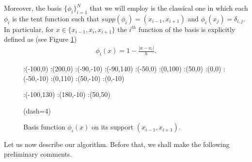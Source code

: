 Moreover, the basis $\big\{\phi_i\big\}_{i=1}^N$ that we will employ is the classical one in which each $\phi_i$ is the tent function such that $supp(\phi_i)=(x_{i-1},x_{i+1})$ and $\phi_i(x_j)=\delta_{i,j}$. In particular, for $x\in\{x_{i-1},x_i,x_{i+1}\}$ the $i^{th}$ function of the basis is explicitly defined as (see Figure \ref{basis}) 
\begin{align}\label{basis_fun}
	\phi_i(x)= 1-\frac{|x-x_i|}{h}.
\end{align} 

\begin{figure}[h]
\figinit{0.8pt}
:(-100,0) :(200,0)
:(-90,-10) :(-90,140)
:(-50,0) :(0,100) 
:(50,0) :(0,0)
%
:(-50,-10) :(0,110) 
:(50,-10) :(0,-10)

:(-100,130) :(180,-10)
:(50,50)

\figdrawbegin{}
\figdrawarrow[1,2]
\figdrawline[3,4]
\figdrawline[4,5]
\figset(dash=4)
\figdrawline[4,6]
\figdrawarrow[11,12]

\figdrawend

\centerline{\box\figBoxA}
\caption{Basis function $\phi_i(x)$ on its support $(x_{i-1},x_{i+1})$.}\label{basis}
\end{figure}
\noindent Let us now describe our algorithm. Before that, we shall make the following preliminary comments.
